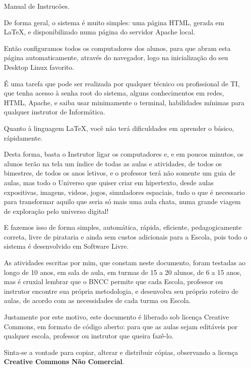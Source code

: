 
\LARGE Manual de Instrucões.

		\begin{multicols}{2}
	
	\normalsize	De forma geral, o sistema é muito simples: uma página HTML, gerada em \LaTeX, e disponibilizado  numa página do servidor Apache local.
	
	Então configuramos todos os computadores dos alunos, para que abram esta página automaticamente, através do navegador, logo na inicialização do seu Desktop Linux favorito.
	
	É uma tarefa que pode ser realizada por qualquer técnico ou profissional de TI, que tenha acesso à senha root do sistema, alguns conhecimentos em redes, HTML, Apache, e saiba usar minimamente o terminal, habilidades mínimas para qualquer instrutor de Informática.
	
	Quanto à linguagem \LaTeX, você não terá dificuldades em aprender o básico, rápidamente.
	
	Desta forma, basta o Instrutor ligar os computadores e, e em poucos minutos, os alunos terão na tela um índice de todas as aulas e atividades, de todos  os bimestres, de todos os anos letivos, e o professor terá não somente um guia de aulas, mas todo o Universo que quiser criar em hipertexto, desde aulas expositivas, imagens, videos, jogos, simuladores espaciais, tudo o que é necessario para transformar aquilo que seria só mais uma aula chata, numa grande viagem de exploração pelo universo digital!
	
	E fazemos isso de forma simples, automática, rápida, eficiente, pedagogicamente correta, livre de pirataria e ainda sem custos adicionais para a Escola, pois todo o sistema é desenvolvido em Software Livre.
	
	As atividades escritas por mim, que constam neste documento, foram testadas ao longo de 10 anos, em sala de aula, em turmas de 15 a 20 alunos, de 6 a 15 anos, mas é cruxial lembrar que o BNCC permite que cada Escola, professor ou instrutor encontre sua própria metodologia, e desenvolva seu próprio roteiro de aulas, de acordo com as necessidades de cada turma ou Escola.
	
	Justamente por este motivo, este documento é liberado sob licença Creative Commons, em formato de código aberto: para que as aulas sejam editáveis por qualquer escola, professor ou instrutor que queira fazê-lo.
	
	Sinta-se a vontade para copiar, alterar e distribuir cópias, observando a licença \textbf{Creative Commons Não Comercial}.
	

\end{multicols}
